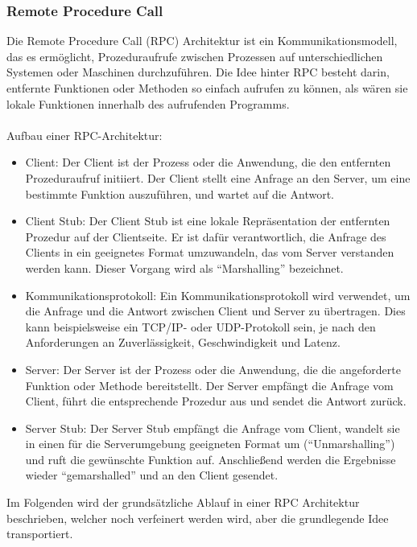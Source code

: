 \subsubsection{Remote Procedure Call}

Die Remote Procedure Call (RPC) Architektur ist ein Kommunikationsmodell, das es ermöglicht, Prozeduraufrufe zwischen Prozessen auf unterschiedlichen Systemen oder Maschinen durchzuführen. Die Idee hinter RPC besteht darin, entfernte Funktionen oder Methoden so einfach aufrufen zu können, als wären sie lokale Funktionen innerhalb des aufrufenden Programms.
\\\\
Aufbau einer RPC-Architektur:
\begin{itemize} 
\item Client: Der Client ist der Prozess oder die Anwendung, die den entfernten Prozeduraufruf initiiert. Der Client stellt eine Anfrage an den Server, um eine bestimmte Funktion auszuführen, und wartet auf die Antwort.
\item Client Stub: Der Client Stub ist eine lokale Repräsentation der entfernten Prozedur auf der Clientseite. Er ist dafür verantwortlich, die Anfrage des Clients in ein geeignetes Format umzuwandeln, das vom Server verstanden werden kann. Dieser Vorgang wird als \enquote{Marshalling} bezeichnet.
\item Kommunikationsprotokoll: Ein Kommunikationsprotokoll wird verwendet, um die Anfrage und die Antwort zwischen Client und Server zu übertragen. Dies kann beispielsweise ein TCP/IP- oder UDP-Protokoll sein, je nach den Anforderungen an Zuverlässigkeit, Geschwindigkeit und Latenz.
\item Server: Der Server ist der Prozess oder die Anwendung, die die angeforderte Funktion oder Methode bereitstellt. Der Server empfängt die Anfrage vom Client, führt die entsprechende Prozedur aus und sendet die Antwort zurück.
\item Server Stub: Der Server Stub empfängt die Anfrage vom Client, wandelt sie in einen für die Serverumgebung geeigneten Format um (\enquote{Unmarshalling}) und ruft die gewünschte Funktion auf. Anschließend werden die Ergebnisse wieder \enquote{gemarshalled} und an den Client gesendet.
\end{itemize}     

Im Folgenden wird der grundsätzliche Ablauf in einer RPC Architektur beschrieben, welcher noch verfeinert werden wird, aber die grundlegende Idee transportiert. 

